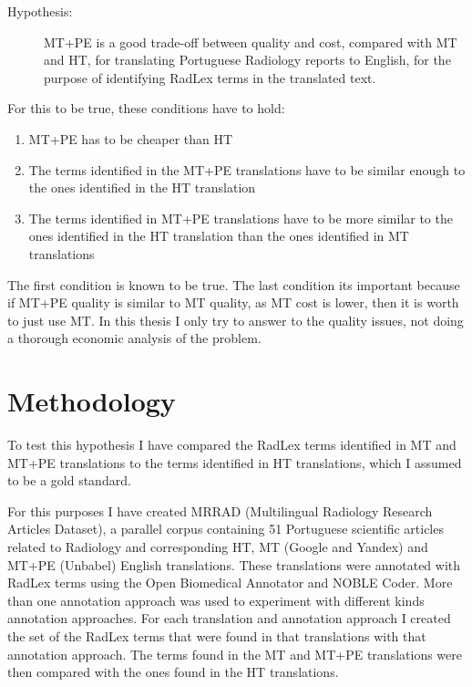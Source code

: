 \newcommand{\hypothesis}{
\begin{description}
	\item[Hypothesis:] MT+PE is a good trade-off between quality and cost, compared with MT and HT, for translating Portuguese Radiology reports to English, for the purpose of identifying RadLex terms in the translated text. 
\end{description}
}
\hypothesis

For this to be true, these conditions have to hold:

\begin{enumerate}
	\item MT+PE has to be cheaper than HT
	\item The terms identified in the MT+PE translations have to be similar enough to the ones identified in the HT translation
	\item The terms identified in MT+PE translations have to be more similar to the ones identified in the HT translation than the ones identified in MT translations
\end{enumerate}

The first condition is known to be true. The last condition its important because if MT+PE quality is similar to MT quality, as MT cost is lower, then it is worth to just use MT. In this thesis I only try to answer to the quality issues, not doing a thorough economic analysis of the problem. 

\section{Methodology}

To test this hypothesis I have compared the RadLex terms identified in MT and MT+PE translations to the terms identified in HT translations, which I assumed to be a gold standard.

For this purposes I have created MRRAD (Multilingual Radiology Research Articles Dataset), a parallel corpus containing 51 Portuguese scientific articles related to Radiology and corresponding HT, MT (Google and Yandex) and MT+PE (Unbabel) English translations. These translations were annotated with RadLex terms using the Open Biomedical Annotator and NOBLE Coder. More than one annotation approach was used to experiment with different kinds annotation approaches. For each translation and annotation approach I created the set of the RadLex terms that were found in that translations with that annotation approach. The terms found in the MT and MT+PE translations were then compared with the ones found in the HT translations.

